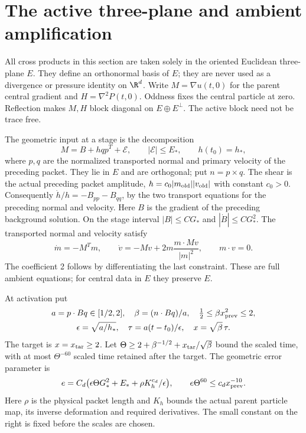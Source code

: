 \section{The active three-plane and ambient amplification}
All cross products in this section are taken solely in the oriented Euclidean
three-plane $E$. They define an orthonormal basis of $E$; they are never used
as a divergence or pressure identity on $\R^d$. Write $M=\nabla u(t,0)$ for
the parent central gradient and $H=\nabla^2P(t,0)$. Oddness fixes the central
particle at zero. Reflection makes $M,H$ block diagonal on $E\oplus E^\perp$.
The active block need not be trace free.

The geometric input at a stage is the decomposition
\begin{equation}\label{eq:central-decomposition}
 M=B+hqp^T+\mathcal E,\qquad |\mathcal E|\leq E_*,\qquad h(t_0)=h_*,
\end{equation}
where $p,q$ are the normalized transported normal and primary velocity of
the preceding packet. They lie in $E$ and are orthogonal; put $n=p\times q$.
The shear is the actual preceding packet amplitude,
$h=c_0|m_{\rm old}||v_{\rm old}|$ with constant $c_0>0$.
Consequently $\dot h/h=-B_{pp}-B_{qq}$, by the two transport equations
for the preceding normal and velocity.
Here $B$ is the gradient of the preceding background solution.
On the stage interval $|B|\leq C G_*$ and $|\dot B|\leq C G_*^2$.
The transported normal and velocity satisfy
\begin{equation}\label{eq:ray-velocity}
 \dot m=-M^Tm,\qquad
 \dot v=-Mv+2m\frac{m\cdot Mv}{|m|^2},\qquad m\cdot v=0.
\end{equation}
The coefficient 2 follows by differentiating the last constraint. These
are full ambient equations; for central data in $E$ they preserve $E$.

At activation put
\begin{gather*}
 a=p\cdot Bq\in[1/2,2],\quad \beta=(n\cdot Bq)/a,
 \quad \tfrac12\leq\beta x_{\rm prev}^2\leq2,\\
 \epsilon=\sqrt{a/h_*},\quad
 \tau=a(t-t_0)/\epsilon,\quad x=\sqrt\beta\,\tau.
\end{gather*}
The target is $x=x_{\rm tar}\geq2$. Let
$\Theta\geq2+\beta^{-1/2}+x_{\rm tar}/\sqrt\beta$ bound the scaled time,
with at most $\Theta^{-60}$ scaled time retained after the target.
The geometric error parameter is
\begin{equation}\label{eq:geometric-error}
 e=C_d\bigl(\epsilon\Theta G_*^2+E_*+
                   \rho K_h^{c_d}/\epsilon\bigr),
 \qquad e\Theta^{60}\leq c_d x_{\rm prev}^{-10}.
\end{equation}
Here $\rho$ is the physical packet length and $K_h$ bounds the actual
parent particle map, its inverse deformation and required derivatives.
The small constant on the right is fixed before the scales are chosen.

